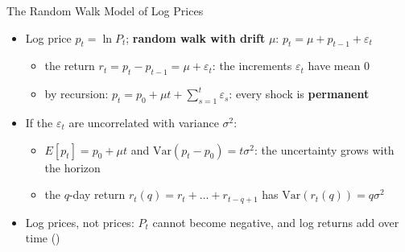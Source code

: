 \begin{frame}{The Random Walk Model of Log Prices}
\itemsize{\small}
\begin{itemize}
    \item Log price $p_t = \ln P_t$; \textbf{random walk with drift} $\mu$: $p_t = \mu + p_{t-1} + \varepsilon_t$
    \begin{itemize}
        \item the return $r_t = p_t - p_{t-1} = \mu + \varepsilon_t$: the increments $\varepsilon_t$ have mean 0
        \item by recursion: $p_t = p_0 + \mu t + \sum_{s=1}^{t} \varepsilon_s$: every shock is \textbf{permanent}
    \end{itemize}
    \item If the $\varepsilon_t$ are uncorrelated with variance $\sigma^2$:
    \begin{itemize}
        \item $E[p_t] = p_0 + \mu t$ and $\mathrm{Var}(p_t - p_0) = t\sigma^2$: the uncertainty grows with the horizon
        \item the $q$-day return $r_t(q) = r_t + \dots + r_{t-q+1}$ has $\mathrm{Var}(r_t(q)) = q\sigma^2$
    \end{itemize}
    \item Log prices, not prices: $P_t$ cannot become negative, and log returns add over time ()
\end{itemize}
\end{frame}

